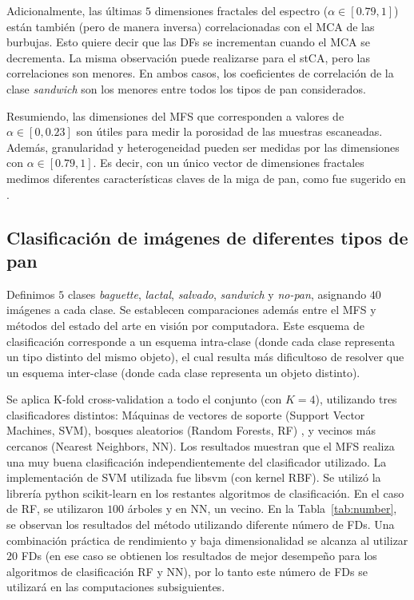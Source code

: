Adicionalmente, las últimas $5$ dimensiones fractales  del espectro ($\alpha \in [0.79,1]$) están también (pero de manera inversa) correlacionadas con el MCA de las burbujas.
Esto quiere decir que las DFs se incrementan cuando el MCA se decrementa.
La misma observación puede realizarse para el stCA, pero las correlaciones son menores.
En ambos casos, los coeficientes de correlación de la clase {\em sandwich} son los menores entre todos los tipos de pan considerados.

Resumiendo, las dimensiones del MFS que corresponden a valores de  $\alpha \in [0,0.23]$ son útiles para medir la porosidad de las muestras escaneadas. Además, granularidad y heterogeneidad pueden ser medidas por las dimensiones con  $\alpha \in [0.79,1]$.
Es decir, con un único vector de dimensiones fractales medimos diferentes características claves de la miga de pan, como fue sugerido en \cite{Gonzales2008}.

\subsection{Clasificaci\'on de imágenes de diferentes tipos de pan}

Definimos $5$ clases {\em baguette}, {\em lactal}, {\em salvado}, {\em sandwich} y {\em no-pan}, asignando $40$ imágenes a cada clase.  Se establecen comparaciones además entre el MFS y métodos del estado del arte en visión por computadora.
Este esquema de clasificación corresponde a un esquema intra-clase (donde cada clase representa un tipo distinto del mismo objeto), el cual resulta más dificultoso de resolver que un esquema inter-clase (donde cada clase representa un objeto distinto).

Se aplica K-fold cross-validation a todo el conjunto (con $K=4$), utilizando tres clasificadores distintos: Máquinas de vectores de soporte (Support Vector Machines, \acrshort{SVM}),  bosques aleatorios (Random Forests, \acrshort{RF}) \cite{Breiman2001}, y vecinos más cercanos (Nearest Neighbors, \acrshort{NN}).
Los resultados muestran que el MFS realiza una muy buena clasificación independientemente del clasificador utilizado.
La implementación de SVM utilizada fue \textsf{libsvm} \cite{Chang2011} (con kernel RBF).
Se utilizó la librería python \textsf{scikit-learn} en los restantes algoritmos de clasificación.
En el caso de RF, se utilizaron $100$ árboles y en NN, un vecino.
En la Tabla~\ref{tab:number}, se observan los resultados del método utilizando diferente número de FDs.
Una combinación práctica de rendimiento y baja dimensionalidad se alcanza al utilizar $20$ FDs (en ese caso se obtienen los resultados de mejor desempeño para los algoritmos de clasificación RF y NN), por lo tanto este número de FDs se utilizará en las computaciones subsiguientes.


